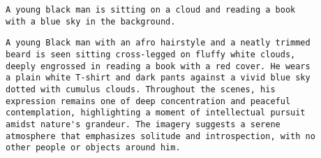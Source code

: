 
\begin{promptbox}
\begin{verbatim}
A young black man is sitting on a cloud and reading a book 
with a blue sky in the background.
\end{verbatim}
\end{promptbox}
\begin{promptbox}
\begin{verbatim}
A young Black man with an afro hairstyle and a neatly trimmed 
beard is seen sitting cross-legged on fluffy white clouds, 
deeply engrossed in reading a book with a red cover. He wears 
a plain white T-shirt and dark pants against a vivid blue sky 
dotted with cumulus clouds. Throughout the scenes, his 
expression remains one of deep concentration and peaceful 
contemplation, highlighting a moment of intellectual pursuit 
amidst nature's grandeur. The imagery suggests a serene 
atmosphere that emphasizes solitude and introspection, with no 
other people or objects around him.
\end{verbatim}
\end{promptbox}


% 


